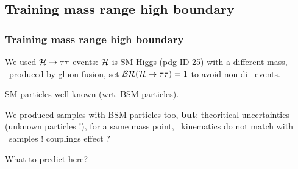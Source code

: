 \subsection*{Training mass range high boundary}
\begin{frame}
\frametitle{Training mass range high boundary}

\begin{minipage}[c]{.53\textwidth}
\manip We used $\mathcal{H}\to\tau\tau$ events:
\submanip $\mathcal{H}$ is SM Higgs (pdg ID 25) with a different mass,
\submanip \higgsML\ produced by gluon fusion,
\submanip set $\mathcal{BR}(\mathcal{H}\to\tau\tau)=1$ to avoid non di-\tau\ events.

\manip SM particles well known (wrt. BSM particles).

\manip We produced samples with BSM particles too, \textbf{but}:
\submanip theoritical uncertainties (unknown particles !),
\submanip for a same mass point, \tau\ kinematics do not match with \higgsML\ samples !
\submanip couplings effect ?
\end{minipage}
\hfill
\begin{minipage}[c]{.45\textwidth}
\begin{center}


\vspace{\baselineskip}

What to predict here?
\end{center}
\end{minipage}

\end{frame}